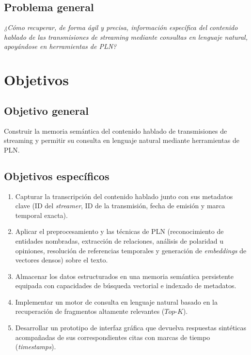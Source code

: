\documentclass[12pt,a4paper]{article}
\begin{document}
\subsection{Problema general}

\emph{¿Cómo recuperar, de forma ágil y precisa, información específica del contenido hablado de las transmisiones de streaming mediante consultas en lenguaje natural, apoyándose en herramientas de PLN?}

\section{Objetivos}
\label{sec:objetivos}

\subsection{Objetivo general}

Construir la memoria semántica del contenido hablado de transmisiones de streaming y permitir su consulta en lenguaje natural mediante herramientas de PLN.

\subsection{Objetivos específicos}

\begin{enumerate}
  \item Capturar la transcripción del contenido hablado junto con sus metadatos clave (ID del \emph{streamer}, ID de la transmisión, fecha de emisión y marca temporal exacta).
  \item Aplicar el preprocesamiento y las técnicas de PLN (reconocimiento de entidades nombradas, extracción de relaciones, análisis de polaridad u opiniones, resolución de referencias temporales y generación de \emph{embeddings} de vectores densos) sobre el texto.
  \item Almacenar los datos estructurados en una memoria semántica persistente equipada con capacidades de búsqueda vectorial e indexado de metadatos.
  \item Implementar un motor de consulta en lenguaje natural basado en la recuperación de fragmentos altamente relevantes ($Top\text{-}K$).
  \item Desarrollar un prototipo de interfaz gráfica que devuelva respuestas sintéticas acompañadas de sus correspondientes citas con marcas de tiempo (\emph{timestamps}).
\end{enumerate}
\end{document}

